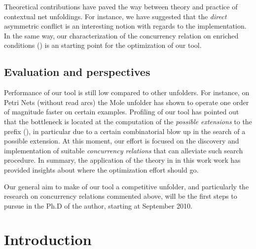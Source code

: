 \documentclass[11pt,a4paper]{article}
\begin{document}
Theoretical contributions have paved the way between theory and practice of
contextual net unfoldings.  For instance, we have suggested that the
\emph{direct} asymmetric conflict is an interesting notion with regards to the
implementation.  In the same way, our characterization of the concurrency
relation on enriched conditions () is an starting point for
the optimization of our tool.

\subsection*{Evaluation and perspectives}

Performance of our tool is still low compared to other unfolders.  For
instance, on Petri Nets (without read arcs) the Mole unfolder  has
shown to operate one order of magnitude faster on certain examples.  Profiling
of our tool has pointed out that the bottleneck is located at the computation
of the \emph{possible extensions} to the prefix (),
in particular due to a certain combinatorial blow up in the search of a
possible extension.  At this moment, our effort is focused on the discovery and
implementation of suitable \emph{concurrency relations} that can alleviate such
search procedure.  In summary, the application of the theory in 
in this work work has provided insights about where the optimization effort
should go.

Our general aim to make of our tool a competitive unfolder, and particularly
the research on concurrency relations commented above, will be the first steps
to pursue in the Ph.D of the author, starting at September 2010.

\newpage

\section{Introduction}
\label{sec:introduction}
\end{document}
